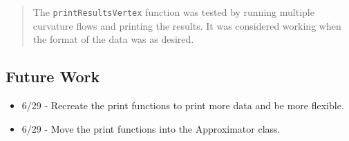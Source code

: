 \begin{quotation}
The \texttt{printResultsVertex} function was tested by running multiple
curvature flows and printing the results. It was considered working when the
format of the data was as desired.
\end{quotation}

\subsection*{Future Work}

\begin{itemize}
\item 6/29 - Recreate the print functions to print more data and be more
flexible.

\item 6/29 - Move the print functions into the Approximator class.
\end{itemize}


%
